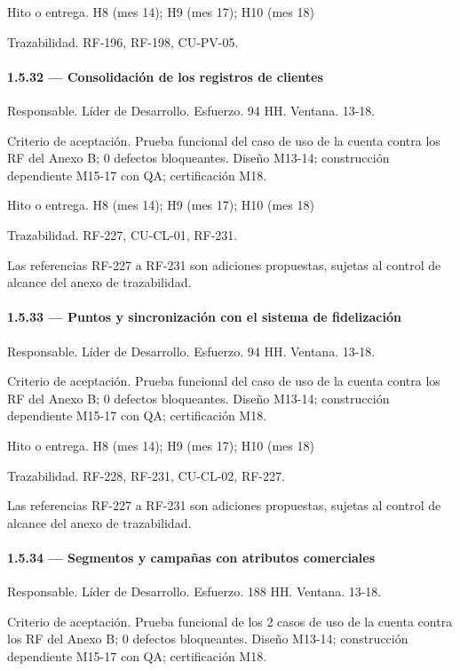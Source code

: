 \documentclass[11pt]{article}
\begin{document}
Hito o entrega. H8 (mes 14); H9 (mes 17); H10 (mes 18)

Trazabilidad. RF-196, RF-198, CU-PV-05.

\paragraph{1.5.32 — Consolidación de los registros de clientes}

Responsable. Líder de Desarrollo. Esfuerzo. 94 HH. Ventana. 13-18.

Criterio de aceptación. Prueba funcional del caso de uso de la cuenta contra los RF del Anexo B; 0 defectos bloqueantes. Diseño M13-14; construcción dependiente M15-17 con QA; certificación M18.

Hito o entrega. H8 (mes 14); H9 (mes 17); H10 (mes 18)

Trazabilidad. RF-227, CU-CL-01, RF-231.

Las referencias RF-227 a RF-231 son adiciones propuestas, sujetas al control de alcance del anexo de trazabilidad.

\paragraph{1.5.33 — Puntos y sincronización con el sistema de fidelización}

Responsable. Líder de Desarrollo. Esfuerzo. 94 HH. Ventana. 13-18.

Criterio de aceptación. Prueba funcional del caso de uso de la cuenta contra los RF del Anexo B; 0 defectos bloqueantes. Diseño M13-14; construcción dependiente M15-17 con QA; certificación M18.

Hito o entrega. H8 (mes 14); H9 (mes 17); H10 (mes 18)

Trazabilidad. RF-228, RF-231, CU-CL-02, RF-227.

Las referencias RF-227 a RF-231 son adiciones propuestas, sujetas al control de alcance del anexo de trazabilidad.

\paragraph{1.5.34 — Segmentos y campañas con atributos comerciales}

Responsable. Líder de Desarrollo. Esfuerzo. 188 HH. Ventana. 13-18.

Criterio de aceptación. Prueba funcional de los 2 casos de uso de la cuenta contra los RF del Anexo B; 0 defectos bloqueantes. Diseño M13-14; construcción dependiente M15-17 con QA; certificación M18.
\end{document}
